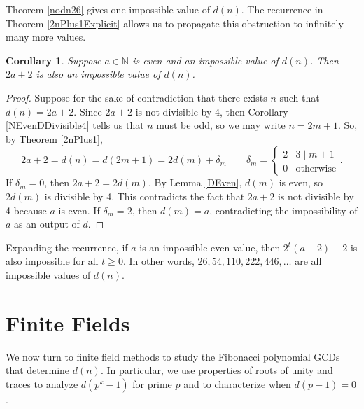 \documentclass[a4paper]{article}
\newtheorem{corollary}[theorem]{Corollary}
\newcommand{\N}{\mathbb{N}}
\begin{document}
	Theorem \ref{nodn26} gives one impossible value of $d(n)$.
	The recurrence in Theorem \ref{2nPlus1Explicit} allows us to propagate this obstruction to infinitely many more values.
	\begin{corollary}
		Suppose $a \in \N$ is even and an impossible value of $d(n)$.
		Then $2a+2$ is also an impossible value of $d(n)$.
	\end{corollary}
	\begin{proof}
		Suppose for the sake of contradiction that there exists $n$ such that $d(n) = 2a+2$.
		Since $2a+2$ is not divisible by 4, then Corollary \ref{NEvenDDivisible4} tells us that $n$ must be odd, so we may write $n = 2m+1$.
		So, by Theorem \ref{2nPlus1},
		\begin{equation*}
			2a+2 = d(n) = d(2m+1) = 2d(m) + \delta_m \qquad \delta_m = \begin{cases}
				2 & 3 \mid m+1 \\
				0 & \text{otherwise}
			\end{cases}.
		\end{equation*}
		If $\delta_m = 0$, then $2a+2 = 2d(m)$.
		By Lemma \ref{DEven}, $d(m)$ is even, so $2d(m)$ is divisible by 4.
		This contradicts the fact that $2a+2$ is not divisible by 4 because $a$ is even.
		If $\delta_m = 2$, then $d(m)=a$, contradicting the impossibility of $a$ as an output of $d$.
	\end{proof}
	Expanding the recurrence, if $a$ is an impossible even value, then $2^t(a+2)-2$ is also impossible for all $t \geq 0$.
	In other words, $26, 54, 110, 222, 446, \ldots$ are all impossible values of $d(n)$.
	
	\section{Finite Fields}
	We now turn to finite field methods to study the Fibonacci polynomial GCDs that determine $d(n)$.
	In particular, we use properties of roots of unity and traces to analyze $d(p^k - 1)$ for prime $p$ and to characterize when $d(p-1) = 0$.
	
\end{document}
